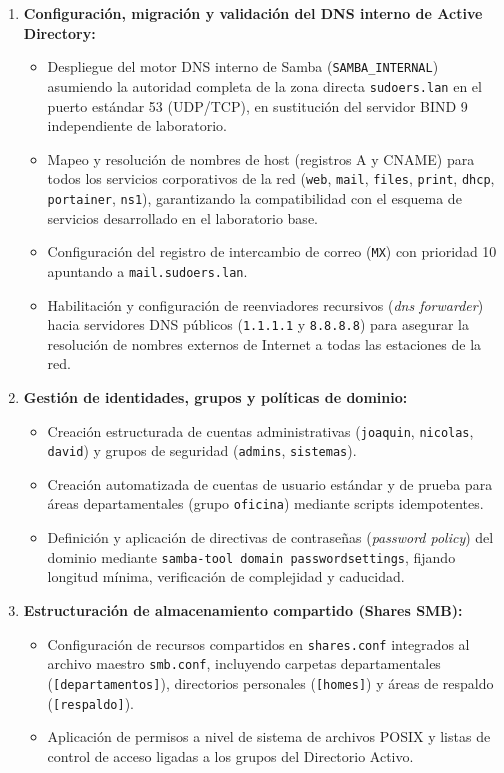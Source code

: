 \begin{enumerate}[label=\textbf{\arabic*.}]
    \item \textbf{Configuración, migración y validación del DNS interno de Active Directory:}
    \begin{itemize}
        \item Despliegue del motor DNS interno de Samba (\texttt{SAMBA\_INTERNAL}) asumiendo la autoridad completa de la zona directa \texttt{sudoers.lan} en el puerto estándar 53 (UDP/TCP), en sustitución del servidor BIND 9 independiente de laboratorio.
        \item Mapeo y resolución de nombres de host (registros A y CNAME) para todos los servicios corporativos de la red (\texttt{web}, \texttt{mail}, \texttt{files}, \texttt{print}, \texttt{dhcp}, \texttt{portainer}, \texttt{ns1}), garantizando la compatibilidad con el esquema de servicios desarrollado en el laboratorio base.
        \item Configuración del registro de intercambio de correo (\texttt{MX}) con prioridad 10 apuntando a \texttt{mail.sudoers.lan}.
        \item Habilitación y configuración de reenviadores recursivos (\textit{dns forwarder}) hacia servidores DNS públicos (\texttt{1.1.1.1} y \texttt{8.8.8.8}) para asegurar la resolución de nombres externos de Internet a todas las estaciones de la red.
    \end{itemize}

    \item \textbf{Gestión de identidades, grupos y políticas de dominio:}
    \begin{itemize}
        \item Creación estructurada de cuentas administrativas (\texttt{joaquin}, \texttt{nicolas}, \texttt{david}) y grupos de seguridad (\texttt{admins}, \texttt{sistemas}).
        \item Creación automatizada de cuentas de usuario estándar y de prueba para áreas departamentales (grupo \texttt{oficina}) mediante scripts idempotentes.
        \item Definición y aplicación de directivas de contraseñas (\textit{password policy}) del dominio mediante \texttt{samba-tool domain passwordsettings}, fijando longitud mínima, verificación de complejidad y caducidad.
    \end{itemize}

    \item \textbf{Estructuración de almacenamiento compartido (Shares SMB):}
    \begin{itemize}
        \item Configuración de recursos compartidos en \texttt{shares.conf} integrados al archivo maestro \texttt{smb.conf}, incluyendo carpetas departamentales (\texttt{[departamentos]}), directorios personales (\texttt{[homes]}) y áreas de respaldo (\texttt{[respaldo]}).
        \item Aplicación de permisos a nivel de sistema de archivos POSIX y listas de control de acceso ligadas a los grupos del Directorio Activo.
    \end{itemize}


\end{enumerate}
